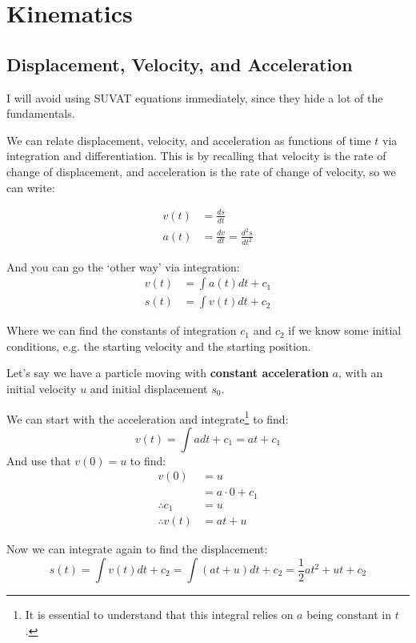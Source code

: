 \section{Kinematics}\label{sec:kinematics}

\subsection{Displacement, Velocity, and Acceleration}\label{sec:displacement_velocity_acceleration}

I will avoid using SUVAT equations immediately, since they hide a lot of the fundamentals.

We can relate displacement, velocity, and acceleration as functions of time $t$ via integration and differentiation. This is by recalling that 
velocity is the rate of change of displacement, and acceleration is the rate of change of velocity, so we can write:

\begin{align*}
    v(t) &= \frac{ds}{dt} \\
    a(t) &= \frac{dv}{dt} = \frac{d^2s}{dt^2}
\end{align*}

And you can go the `other way' via integration:
\begin{align*}
    v(t) &= \int a(t) dt + c_1 \\
    s(t) &= \int v(t) dt + c_2
\end{align*}

Where we can find the constants of integration $c_1$ and $c_2$ if we know some initial conditions, e.g. the starting velocity and the starting position.

Let's say we have a particle moving with \textbf{constant acceleration} $a$, with an initial velocity $u$ and initial displacement $s_0$. 

We can start with the acceleration and integrate\footnote{It is essential to understand that this integral relies on $a$ being constant in $t$.} to find:
\[ v(t) = \int a dt + c_1  = at + c_1\]
And use that $v(0) = u$ to find:
\begin{align*}
    v(0) &= u \\
    &=  a \cdot 0 + c_1  \\
    \therefore c_1 &= u\\
    \therefore v(t) &= at + u
\end{align*}


Now we can integrate again to find the displacement:
\[ s(t) = \int v(t) dt + c_2 = \int (at + u) dt + c_2 = \frac{1}{2}at^2 + ut + c_2 \]


